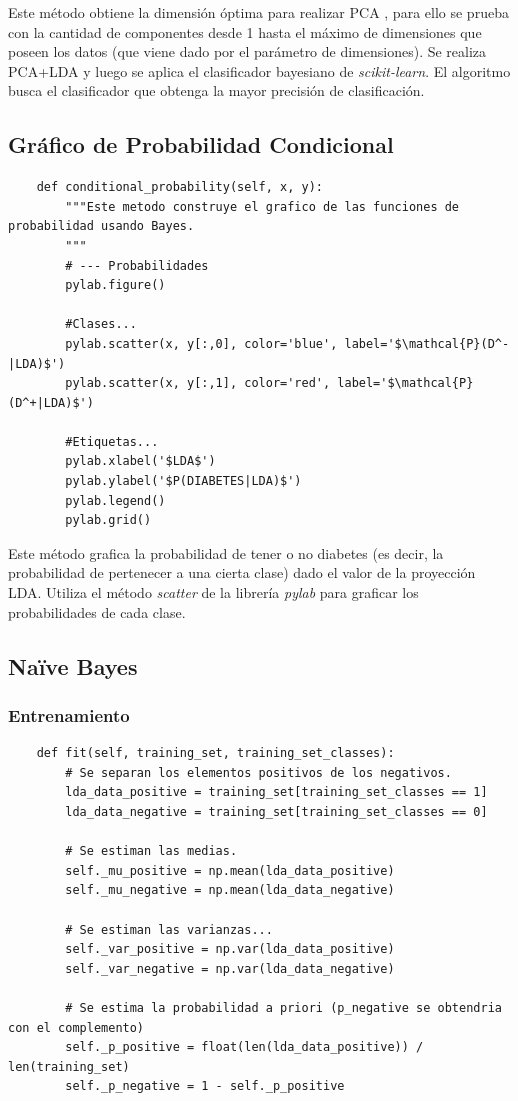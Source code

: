 \documentclass[letter, titlepage, 10pt]{article}
\begin{document}
Este método obtiene la dimensión óptima para realizar PCA , para ello se prueba con la cantidad de componentes desde 1 hasta el máximo de dimensiones que poseen los datos (que viene dado por el parámetro de dimensiones). Se realiza PCA+LDA y luego se aplica el clasificador bayesiano de \textit{scikit-learn}. El algoritmo busca el clasificador que obtenga la mayor precisión de clasificación.\\

\subsection{Gráfico de Probabilidad Condicional}
\begin{lstlisting} 
    def conditional_probability(self, x, y):
        """Este metodo construye el grafico de las funciones de probabilidad usando Bayes.
        """
        # --- Probabilidades
        pylab.figure()
        
        #Clases...
        pylab.scatter(x, y[:,0], color='blue', label='$\mathcal{P}(D^-|LDA)$')
        pylab.scatter(x, y[:,1], color='red', label='$\mathcal{P}(D^+|LDA)$')
        
        #Etiquetas...
        pylab.xlabel('$LDA$')
        pylab.ylabel('$P(DIABETES|LDA)$')
        pylab.legend()
        pylab.grid()
\end{lstlisting}
Este método grafica la probabilidad de tener o no diabetes (es decir, la probabilidad de pertenecer a una cierta clase) dado el valor de la proyección LDA. Utiliza el método \textit{scatter} de la librería \textit{pylab} para graficar los probabilidades de cada clase.

\newpage

\subsection{Naïve Bayes}
\subsubsection{Entrenamiento}
\begin{lstlisting}
    def fit(self, training_set, training_set_classes):
        # Se separan los elementos positivos de los negativos.
        lda_data_positive = training_set[training_set_classes == 1]
        lda_data_negative = training_set[training_set_classes == 0]

        # Se estiman las medias.
        self._mu_positive = np.mean(lda_data_positive)
        self._mu_negative = np.mean(lda_data_negative)

        # Se estiman las varianzas...
        self._var_positive = np.var(lda_data_positive)
        self._var_negative = np.var(lda_data_negative)

        # Se estima la probabilidad a priori (p_negative se obtendria con el complemento)
        self._p_positive = float(len(lda_data_positive)) / len(training_set)
        self._p_negative = 1 - self._p_positive
\end{lstlisting}
\end{document}
